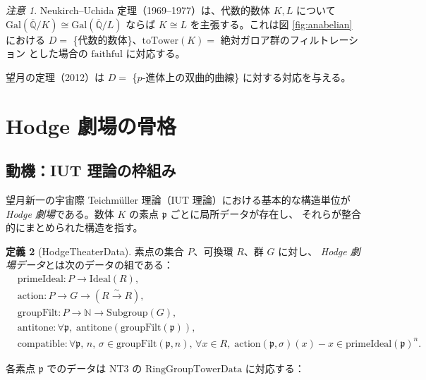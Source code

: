 \documentclass[a4paper,11pt]{ltjsarticle}
\theoremstyle{definition}
\newtheorem{definition}{定義}[section]
\theoremstyle{plain}
\theoremstyle{remark}
\newtheorem{remark}[definition]{注意}
\newcommand{\Gal}{\mathrm{Gal}}
\newcommand{\Nat}{\mathbb{N}}
\begin{document}
\begin{remark}
Neukirch--Uchida 定理（1969--1977）は、代数的数体 $K, L$ について
$\Gal(\overline{\mathbb{Q}}/K) \cong \Gal(\overline{\mathbb{Q}}/L)$
ならば $K \cong L$ を主張する。これは図 \ref{fig:anabelian} における
$D = $ \{代数的数体\}、$\mathrm{toTower}(K) = $ 絶対ガロア群のフィルトレーション
とした場合の $\mathrm{faithful}$ に対応する。

望月の定理（2012）は $D = $ \{$p$-進体上の双曲的曲線\} に対する対応を与える。
\end{remark}

\section{Hodge 劇場の骨格}
\label{sec:hodge}

\subsection{動機：IUT 理論の枠組み}

望月新一の宇宙際 Teichmüller 理論（IUT 理論）における基本的な構造単位が
\emph{Hodge 劇場}である。数体 $K$ の素点 $\mathfrak{p}$ ごとに局所データが存在し、
それらが整合的にまとめられた構造を指す。

\begin{definition}[HodgeTheaterData]
\label{def:hodge}
素点の集合 $P$、可換環 $R$、群 $G$ に対し、
\emph{Hodge 劇場データ}とは次のデータの組である：
\begin{align*}
  &\mathrm{primeIdeal} : P \to \mathrm{Ideal}(R), \\
  &\mathrm{action} : P \to G \to (R \xrightarrow{\sim} R), \\
  &\mathrm{groupFilt} : P \to \Nat \to \mathrm{Subgroup}(G), \\
  &\text{antitone} : \forall \mathfrak{p},\; \mathrm{antitone}(\mathrm{groupFilt}(\mathfrak{p})), \\
  &\text{compatible} : \forall \mathfrak{p},\, n,\, \sigma \in \mathrm{groupFilt}(\mathfrak{p}, n),\,
    \forall x \in R,\; \mathrm{action}(\mathfrak{p}, \sigma)(x) - x \in \mathrm{primeIdeal}(\mathfrak{p})^n.
\end{align*}
\end{definition}

各素点 $\mathfrak{p}$ でのデータは NT3 の $\mathrm{RingGroupTowerData}$ に対応する：
\end{document}
